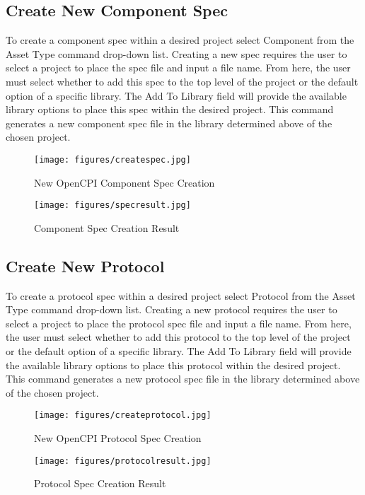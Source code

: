 \newpage

\subsection{Create New Component Spec}
\label{sec:create_spec}
\begin{flushleft}

To create a component spec within a desired project select Component from the Asset Type command drop-down list. Creating a new spec requires the user to select a project to place the spec file and input a file name. From here, the user must select whether to add this spec to the top level of the project or the default option of a specific library. The Add To Library field will provide the available library options to place this spec within the desired project. This command generates a new component spec file in the library determined above of the chosen project.\newline
\begin{figure}[h!]
  \centering
  \texttt{[image: figures/createspec.jpg]}
  \caption{New OpenCPI Component Spec Creation}
  \label{fig:figure6}
\end{figure}

\begin{figure}[h!]
  \centering
  \texttt{[image: figures/specresult.jpg]}
  \caption{Component Spec Creation Result}
  \label{fig:figure7}
\end{figure}

\end{flushleft}

\newpage

\subsection{Create New Protocol}
\label{sec:create_protocol}
\begin{flushleft}

To create a protocol spec within a desired project select Protocol from the Asset Type command drop-down list. Creating a new protocol requires the user to select a project to place the protocol spec file and input a file name. From here, the user must select whether to add this protocol to the top level of the project or the default option of a specific library. The Add To Library field will provide the available library options to place this protocol within the desired project. This command generates a new protocol spec file in the library determined above of the chosen project.\newline
\begin{figure}[h!]
  \centering
  \texttt{[image: figures/createprotocol.jpg]}
  \caption{New OpenCPI Protocol Spec Creation}
  \label{fig:figure8}
\end{figure}

\begin{figure}[h!]
  \centering
  \texttt{[image: figures/protocolresult.jpg]}
  \caption{Protocol Spec Creation Result}
  \label{fig:figure9}
\end{figure}

\end{flushleft}

